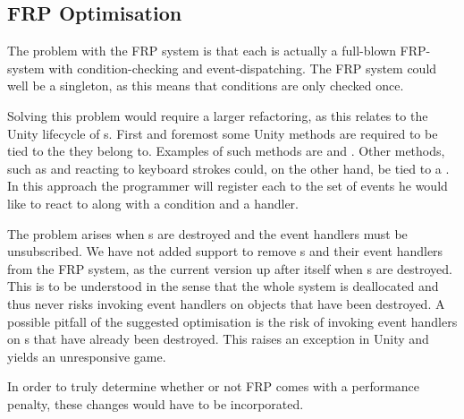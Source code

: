 \subsection{FRP Optimisation} \label{sec:fw:frp:optimisation}
The problem with the \gls{FRP} system is that each  is actually a full-blown \gls{FRP}-system with condition-checking and event-dispatching. The \gls{FRP} system could well be a singleton, as this means that conditions are only checked once.

Solving this problem would require a larger refactoring, as this relates to the Unity lifecycle of s. First and foremost some Unity methods are required to be tied to the  they belong to. Examples of such methods are  and . Other methods, such as  and reacting to keyboard strokes could, on the other hand, be tied to a . In this approach the programmer will register each  to the set of events he would like to react to along with a condition and a handler.

The problem arises when s are destroyed and the event handlers must be unsubscribed. We have not added support to remove s and their event handlers from the \gls{FRP} system, as the current version  up after itself when s are destroyed. This is to be understood in the sense that the whole system is deallocated and thus never risks invoking event handlers on objects that have been destroyed. A possible pitfall of the suggested optimisation is the risk of invoking event handlers on s that have already been destroyed. This raises an exception in Unity and yields an unresponsive game.

In order to truly determine whether or not \gls{FRP} comes with a performance penalty, these changes would have to be incorporated.
